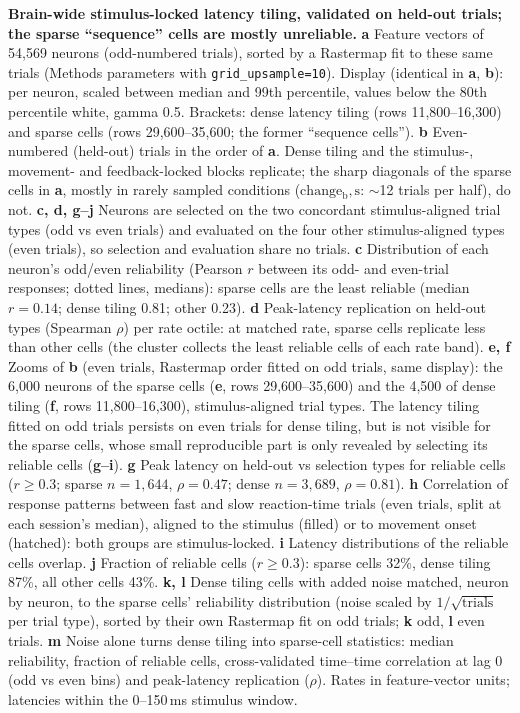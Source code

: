 \caption{\textbf{Brain-wide stimulus-locked latency tiling, validated on held-out trials; the sparse ``sequence'' cells are mostly unreliable.}
\textbf{a} Feature vectors of 54,569 neurons (odd-numbered trials), sorted by a Rastermap fit to these same trials (Methods parameters with \texttt{grid\_upsample=10}). Display (identical in \textbf{a}, \textbf{b}): per neuron, scaled between median and 99th percentile, values below the 80th percentile white, gamma 0.5. Brackets: dense latency tiling (rows 11,800--16,300) and sparse cells (rows 29,600--35,600; the former ``sequence cells'').
\textbf{b} Even-numbered (held-out) trials in the order of \textbf{a}. Dense tiling and the stimulus-, movement- and feedback-locked blocks replicate; the sharp diagonals of the sparse cells in \textbf{a}, mostly in rarely sampled conditions ($\mathrm{change_b,s}$: $\sim$12 trials per half), do not.
\textbf{c, d, g--j} Neurons are selected on the two concordant stimulus-aligned trial types (odd vs even trials) and evaluated on the four other stimulus-aligned types (even trials), so selection and evaluation share no trials.
\textbf{c} Distribution of each neuron's odd/even reliability (Pearson $r$ between its odd- and even-trial responses; dotted lines, medians): sparse cells are the least reliable (median $r=0.14$; dense tiling 0.81; other 0.23).
\textbf{d} Peak-latency replication on held-out types (Spearman $\rho$) per rate octile: at matched rate, sparse cells replicate less than other cells (the cluster collects the least reliable cells of each rate band).
\textbf{e, f} Zooms of \textbf{b} (even trials, Rastermap order fitted on odd trials, same display): the 6,000 neurons of the sparse cells (\textbf{e}, rows 29,600--35,600) and the 4,500 of dense tiling (\textbf{f}, rows 11,800--16,300), stimulus-aligned trial types. The latency tiling fitted on odd trials persists on even trials for dense tiling, but is not visible for the sparse cells, whose small reproducible part is only revealed by selecting its reliable cells (\textbf{g--i}).
\textbf{g} Peak latency on held-out vs selection types for reliable cells ($r\geq0.3$; sparse $n=1{,}644$, $\rho=0.47$; dense $n=3{,}689$, $\rho=0.81$).
\textbf{h} Correlation of response patterns between fast and slow reaction-time trials (even trials, split at each session's median), aligned to the stimulus (filled) or to movement onset (hatched): both groups are stimulus-locked.
\textbf{i} Latency distributions of the reliable cells overlap.
\textbf{j} Fraction of reliable cells ($r\geq0.3$): sparse cells 32\%, dense tiling 87\%, all other cells 43\%.
\textbf{k, l} Dense tiling cells with added noise matched, neuron by neuron, to the sparse cells' reliability distribution (noise scaled by $1/\sqrt{\text{trials}}$ per trial type), sorted by their own Rastermap fit on odd trials; \textbf{k} odd, \textbf{l} even trials.
\textbf{m} Noise alone turns dense tiling into sparse-cell statistics: median reliability, fraction of reliable cells, cross-validated time--time correlation at lag 0 (odd vs even bins) and peak-latency replication ($\rho$).
Rates in feature-vector units; latencies within the 0--150\,ms stimulus window.}
\label{fig:latency_tiling}
